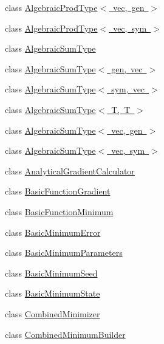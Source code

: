 \begin{DoxyCompactItemize}
\item 
class \mbox{\hyperlink{classROOT_1_1Minuit2_1_1AlgebraicProdType_3_01vec_00_01gen_01_4}{Algebraic\+Prod\+Type$<$ vec, gen $>$}}
\item 
class \mbox{\hyperlink{classROOT_1_1Minuit2_1_1AlgebraicProdType_3_01vec_00_01sym_01_4}{Algebraic\+Prod\+Type$<$ vec, sym $>$}}
\item 
class \mbox{\hyperlink{classROOT_1_1Minuit2_1_1AlgebraicSumType}{Algebraic\+Sum\+Type}}
\item 
class \mbox{\hyperlink{classROOT_1_1Minuit2_1_1AlgebraicSumType_3_01gen_00_01vec_01_4}{Algebraic\+Sum\+Type$<$ gen, vec $>$}}
\item 
class \mbox{\hyperlink{classROOT_1_1Minuit2_1_1AlgebraicSumType_3_01sym_00_01vec_01_4}{Algebraic\+Sum\+Type$<$ sym, vec $>$}}
\item 
class \mbox{\hyperlink{classROOT_1_1Minuit2_1_1AlgebraicSumType_3_01T_00_01T_01_4}{Algebraic\+Sum\+Type$<$ T, T $>$}}
\item 
class \mbox{\hyperlink{classROOT_1_1Minuit2_1_1AlgebraicSumType_3_01vec_00_01gen_01_4}{Algebraic\+Sum\+Type$<$ vec, gen $>$}}
\item 
class \mbox{\hyperlink{classROOT_1_1Minuit2_1_1AlgebraicSumType_3_01vec_00_01sym_01_4}{Algebraic\+Sum\+Type$<$ vec, sym $>$}}
\item 
class \mbox{\hyperlink{classROOT_1_1Minuit2_1_1AnalyticalGradientCalculator}{Analytical\+Gradient\+Calculator}}
\item 
class \mbox{\hyperlink{classROOT_1_1Minuit2_1_1BasicFunctionGradient}{Basic\+Function\+Gradient}}
\item 
class \mbox{\hyperlink{classROOT_1_1Minuit2_1_1BasicFunctionMinimum}{Basic\+Function\+Minimum}}
\item 
class \mbox{\hyperlink{classROOT_1_1Minuit2_1_1BasicMinimumError}{Basic\+Minimum\+Error}}
\item 
class \mbox{\hyperlink{classROOT_1_1Minuit2_1_1BasicMinimumParameters}{Basic\+Minimum\+Parameters}}
\item 
class \mbox{\hyperlink{classROOT_1_1Minuit2_1_1BasicMinimumSeed}{Basic\+Minimum\+Seed}}
\item 
class \mbox{\hyperlink{classROOT_1_1Minuit2_1_1BasicMinimumState}{Basic\+Minimum\+State}}
\item 
class \mbox{\hyperlink{classROOT_1_1Minuit2_1_1CombinedMinimizer}{Combined\+Minimizer}}
\item 
class \mbox{\hyperlink{classROOT_1_1Minuit2_1_1CombinedMinimumBuilder}{Combined\+Minimum\+Builder}}

\end{DoxyCompactItemize}
